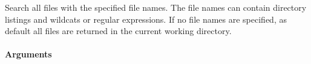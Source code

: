 %


Search all files with the specified file names. The file names can contain 
directory listings and wildcats  or regular expressions.
If no file names are specified, as default all files are returned in the 
current working directory.

\paragraph{Arguments}

